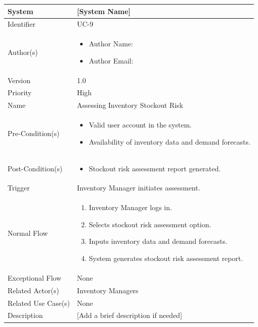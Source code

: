 \begin{center}
	\begin{tabularx}{\textwidth}{|l|X|}
		\hline
		System & [System Name] \\
		\hline
		Identifier & UC-9 \\
		\hline
		Author(s) & \begin{itemize}[left=0pt]
			\item Author Name:
			\item Author Email:
		\end{itemize} \\
		\hline
		Version & 1.0 \\
		\hline
		Priority & High \\
		\hline
		Name & Assessing Inventory Stockout Risk \\
		\hline
		Pre-Condition(s) &  \begin{itemize}[left=0pt]
			\item Valid user account in the system.
			\item Availability of inventory data and demand forecasts.
		\end{itemize} \\
		\hline
		Post-Condition(s) & \begin{itemize}[left=0pt]
			\item Stockout risk assessment report generated.
		\end{itemize} \\
		\hline
		Trigger & Inventory Manager initiates assessment. \\
		\hline
		Normal Flow & \begin{enumerate}[left=0pt]
			\item Inventory Manager logs in.
			\item Selects stockout risk assessment option.
			\item Inputs inventory data and demand forecasts.
			\item System generates stockout risk assessment report.
		\end{enumerate} \\
		\hline
		Exceptional Flow & None \\
		\hline
		Related Actor(s) & Inventory Managers \\
		\hline
		Related Use Case(s) & None \\
		\hline
		Description & [Add a brief description if needed] \\
		\hline
	\end{tabularx}
\end{center}

